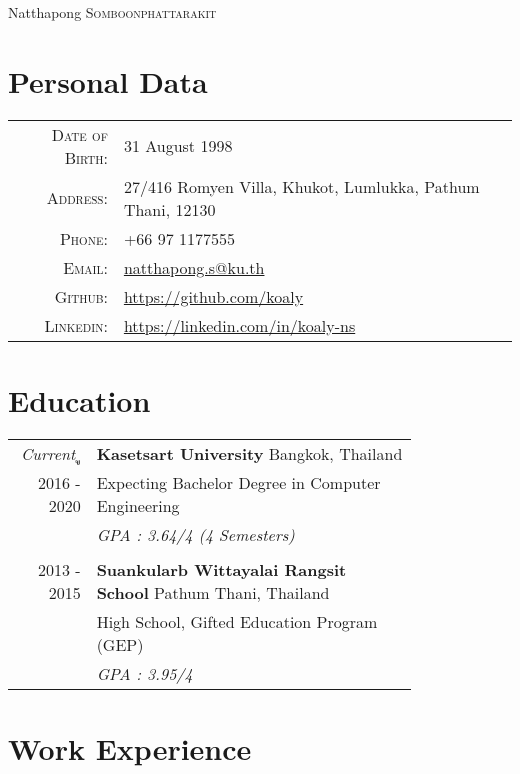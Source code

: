 \documentclass[a4paper]{article}
\begin{document}
\pagestyle{empty}

\begin{center}

\Huge Natthapong \textsc{Somboonphattarakit}

\bigskip
\end{center}

\section{Personal Data}

\begin{tabular}{rl}
    \textsc{Date of Birth:} & 31 August 1998 \\
    \textsc{Address:}   & 27/416 Romyen Villa, Khukot, Lumlukka, Pathum Thani, 12130 \\
    \textsc{Phone:}     & +66 97 1177555\\
    \textsc{Email:}     & \href{mailto:natthapong.s@ku.th}{natthapong.s@ku.th}\\
    \textsc{Github:}	& \href{https://github.com/koaly}{https://github.com/koaly} \\
    \textsc{Linkedin:}	& \href{https://linkedin.com/in/koaly-ns/}{https://linkedin.com/in/koaly-ns}
\end{tabular}

\section{Education}

\begin{tabular}{r|p{0.8\linewidth}}
	\textit{Current} ู& \textbf{Kasetsart University} \hfill Bangkok, Thailand \\
	\textsc{2016 - 2020} & Expecting Bachelor Degree in Computer Engineering \\
	& \sl{GPA : 3.64/4 (4 Semesters)}\\
	\multicolumn{2}{c}{} \\
	\textsc{2013 - 2015} & \textbf{Suankularb Wittayalai Rangsit School} \hfill Pathum Thani, Thailand \\
	& High School, Gifted Education Program (GEP)\\
	& \sl{GPA : 3.95/4} \\
\end{tabular}

\section{Work Experience}
\end{document}
